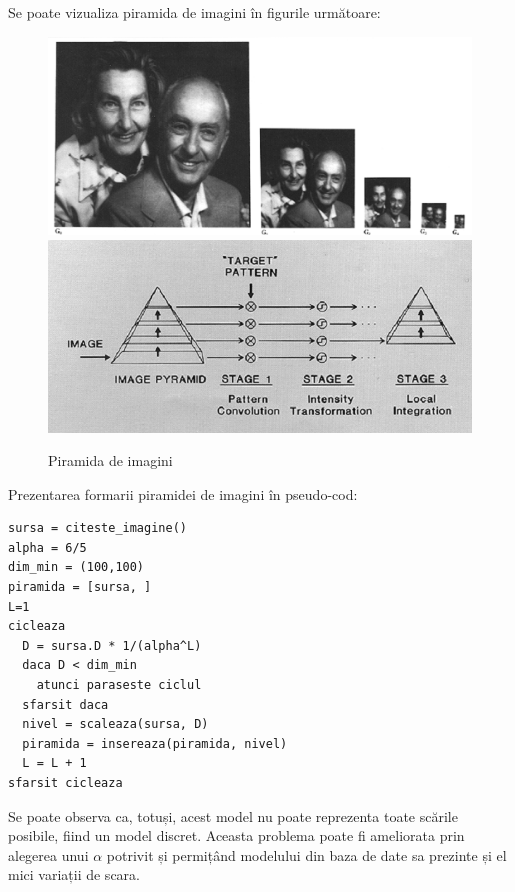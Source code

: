 Se poate vizualiza piramida de imagini în figurile următoare:

\begin{figure}[H]
	\centering
		\includegraphics[width=1.0\textwidth]{imagini/pyramid0.png}
		\includegraphics[width=1.0\textwidth]{imagini/pyramid1.png}
	\caption{Piramida de imagini\protect\footnotemark}
	\label{fig:Pyramids_Tutorial_Pyramid_Theory}
\end{figure}



Prezentarea formarii piramidei de imagini în pseudo-cod:
\begin{mdframed}
\begin{verbatim}
sursa = citeste_imagine()
alpha = 6/5
dim_min = (100,100)
piramida = [sursa, ]
L=1
cicleaza
  D = sursa.D * 1/(alpha^L)
  daca D < dim_min
    atunci paraseste ciclul
  sfarsit daca
  nivel = scaleaza(sursa, D)
  piramida = insereaza(piramida, nivel)
  L = L + 1
sfarsit cicleaza
\end{verbatim}
\end{mdframed}

Se poate observa ca, totuși, acest model nu poate reprezenta toate scările posibile, fiind un model discret.
Aceasta problema poate fi ameliorata prin alegerea unui ${\alpha}$ potrivit și permițând modelului din baza de date sa prezinte și el mici variații de scara.

